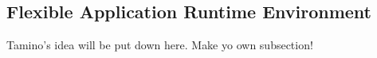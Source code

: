 \subsection{Flexible Application Runtime Environment}

Tamino's idea will be put down here.
Make yo own subsection!